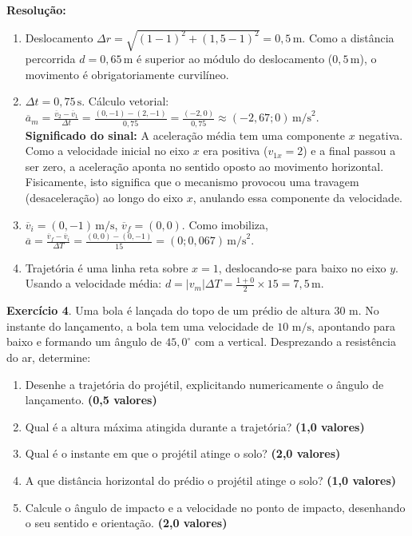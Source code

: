 \documentclass[12pt]{article}
\newcommand{\pontos}[1]{\hfill\textbf{(#1 valores)}}
\begin{document}
	\vspace{0.4cm}
	\textbf{Resolução:}
	\begin{enumerate}[label=\alph*), itemsep=12pt]
		\item Deslocamento $\Delta r = \sqrt{(1-1)^2 + (1,5-1)^2} = 0,5\,\text{m}$. Como a distância percorrida $d = 0,65\,\text{m}$ é superior ao módulo do deslocamento ($0,5\,\text{m}$), o movimento é obrigatoriamente curvilíneo.
		\item $\Delta t = 0,75\,\text{s}$. Cálculo vetorial: $\overline{a}_m = \frac{\overline{v}_2 - \overline{v}_1}{\Delta t} = \frac{(0, -1) - (2, -1)}{0,75} = \frac{(-2, 0)}{0,75} \approx (-2,67; 0)\,\text{m/s}^2$. \\
		\textbf{Significado do sinal:} A aceleração média tem uma componente $x$ negativa. Como a velocidade inicial no eixo $x$ era positiva ($v_{1x} = 2$) e a final passou a ser zero, a aceleração aponta no sentido oposto ao movimento horizontal. Fisicamente, isto significa que o mecanismo provocou uma travagem (desaceleração) ao longo do eixo $x$, anulando essa componente da velocidade.
		\item $\overline{v}_i = (0, -1)\,\text{m/s}$, $\overline{v}_f = (0, 0)$. Como imobiliza, $\overline{a} = \frac{\overline{v}_f-\overline{v}_i}{\Delta T} = \frac{(0,0)-(0,-1)}{15} = (0; 0,067)\,\text{m/s}^2$.
		\item Trajetória é uma linha reta sobre $x=1$, deslocando-se para baixo no eixo $y$. \\
		Usando a velocidade média: $d = |v_m| \Delta T = \frac{1 + 0}{2} \times 15 = 7,5\,\text{m}$.
	\end{enumerate}
	
	\vspace{0.8cm}
	
	\textbf{Exercício 4}. Uma bola é lançada do topo de um prédio de altura $30 \text{ m}$. No instante do lançamento, a bola tem uma velocidade de $10 \text{ m/s}$, apontando para baixo e formando um ângulo de $45,0^\circ$ com a vertical. Desprezando a resistência do ar, determine:
	\begin{enumerate}[label=\textbf{\alph*)}]
		\item Desenhe a trajetória do projétil, explicitando numericamente o ângulo de lançamento. \pontos{0,5}
		\item Qual é a altura máxima atingida durante a trajetória? \pontos{1,0}
		\item Qual é o instante em que o projétil atinge o solo? \pontos{2,0}
		\item A que distância horizontal do prédio o projétil atinge o solo? \pontos{1,0}
		\item Calcule o ângulo de impacto e a velocidade no ponto de impacto, desenhando o seu sentido e orientação. \pontos{2,0}
	\end{enumerate}
	
\end{document}
